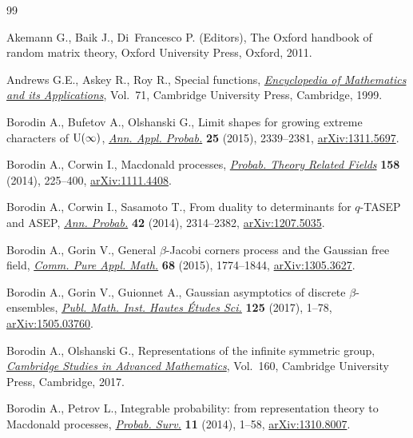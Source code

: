 \documentclass[pdftex]{sigma}
\numberwithin{equation}{section}
\begin{document}
\begin{thebibliography}{99}
\footnotesize\itemsep=0pt

Akemann G., Baik J., Di~Francesco P. (Editors), The {O}xford handbook of random
 matrix theory, Oxford University Press, Oxford, 2011.

Andrews G.E., Askey R., Roy R., Special functions, \href{https://doi.org/10.1017/CBO9781107325937}{\textit{Encyclopedia of
 Mathematics and its Applications}}, Vol.~71, Cambridge University Press,
 Cambridge, 1999.

Borodin A., Bufetov A., Olshanski G., Limit shapes for growing extreme
 characters of {${\rm U}(\infty)$}, \href{https://doi.org/10.1214/14-AAP1050}{\textit{Ann. Appl. Probab.}} \textbf{25} (2015),
 2339--2381, \href{https://arxiv.org/abs/1311.5697}{arXiv:1311.5697}.

Borodin A., Corwin I., Macdonald processes, \href{https://doi.org/10.1007/s00440-013-0482-3}{\textit{Probab. Theory Related
 Fields}} \textbf{158} (2014), 225--400, \href{https://arxiv.org/abs/1111.4408}{arXiv:1111.4408}.

Borodin A., Corwin I., Sasamoto T., From duality to determinants for
 {$q$}-{TASEP} and {ASEP}, \href{https://doi.org/10.1214/13-AOP868}{\textit{Ann. Probab.}} \textbf{42} (2014),
 2314--2382, \href{https://arxiv.org/abs/1207.5035}{arXiv:1207.5035}.

Borodin A., Gorin V., General {$\beta$}-{J}acobi corners process and the
 {G}aussian free f\/ield, \href{https://doi.org/10.1002/cpa.21546}{\textit{Comm. Pure Appl. Math.}} \textbf{68} (2015),
 1774--1844, \href{https://arxiv.org/abs/1305.3627}{arXiv:1305.3627}.

Borodin A., Gorin V., Guionnet A., Gaussian asymptotics of discrete
 {$\beta$}-ensembles, \href{https://doi.org/10.1007/s10240-016-0085-5}{\textit{Publ. Math. Inst. Hautes \'Etudes Sci.}}
 \textbf{125} (2017), 1--78, \href{https://arxiv.org/abs/1505.03760}{arXiv:1505.03760}.

Borodin A., Olshanski G., Representations of the inf\/inite symmetric group,
 \href{https://doi.org/10.1017/CBO9781316798577}{\textit{Cambridge Studies in Advanced Mathematics}}, Vol.~160, Cambridge
 University Press, Cambridge, 2017.

Borodin A., Petrov L., Integrable probability: from representation theory to
 {M}acdonald processes, \href{https://doi.org/10.1214/13-PS225}{\textit{Probab. Surv.}} \textbf{11} (2014), 1--58,
 \href{https://arxiv.org/abs/1310.8007}{arXiv:1310.8007}.


\end{thebibliography}
\end{document}
